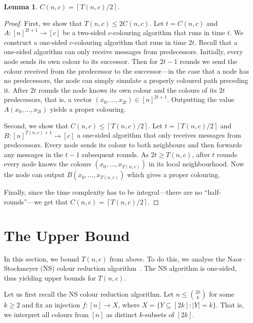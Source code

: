 \documentclass[a4paper,11pt]{article}
\newtheorem{lemma}[theorem]{Lemma}
\theoremstyle{remark}
\begin{document}
\begin{lemma}\label{lemma:hardness}
$C(n,c) = \left \lceil T(n,c)/2 \right \rceil$.
\end{lemma}
\begin{proof}
 First, we show that $T(n,c) \le 2 C(n,c)$. Let $t = C(n,c)$ and $A \colon [n]^{2t+1} \to [c]$ be a two-sided $c$-colouring algorithm that runs in time $t$. We construct a one-sided $c$-colouring algorithm that runs in time $2t$. Recall that a one-sided algorithm can only receive messages from predecessors. Initially, every node sends its own colour to its successor. Then for $2t-1$ rounds we send the colour received from the predecessor to the successor---in the case that a node has no predecessors, the node can simply simulate a properly coloured path preceding it. After $2t$ rounds the node knows its own colour and the colours of its $2t$ predecessors, that is, a vector $(x_0, \dots, x_{2t}) \in [n]^{2t+1}$. Outputting the value $A(x_0, \dots, x_{2t})$ yields a proper colouring. 

 Second, we show that $C(n,c) \le \left\lceil T(n,c) / 2 \right \rceil$. Let $t = \left\lceil T(n,c) / 2 \right \rceil$ and $B \colon [n]^{T(n,c)+1} \to [c]$ a one-sided algorithm that only receives messages from predecessors. Every node sends its colour to both neighbours and then forwards any messages in the $t-1$ subsequent rounds. As $2t \ge T(n,c)$, after $t$ rounds every node knows the colours $(x_0, \dots, x_{T(n,c)})$ in its local neighbourhood. Now the node can output $B(x_0, \dots, x_{T(n,c)})$ which gives a proper colouring.

 Finally, since the time complexity has to be integral---there are no ``half-rounds''---we get that $C(n,c) = \left \lceil T(n,c)/2 \right \rceil$.
\end{proof}


\section{The Upper Bound}

In this section, we bound $T(n,c)$ from above. To do this, we analyse the Naor--Stockmeyer (NS) colour reduction algorithm~\cite{naor95what}. The NS algorithm is one-sided, thus yielding upper bounds for $T(n,c)$.

Let us first recall the NS colour reduction algorithm. Let $n \le { 2k \choose k }$ for some $k \ge 2$ and fix an injection $f \colon [n] \to X$, where $X = \{ Y \subseteq [2k] : |Y| = k \}$. That is, we interpret all colours from $[n]$ as distinct $k$-subsets of $[2k]$.
\end{document}
